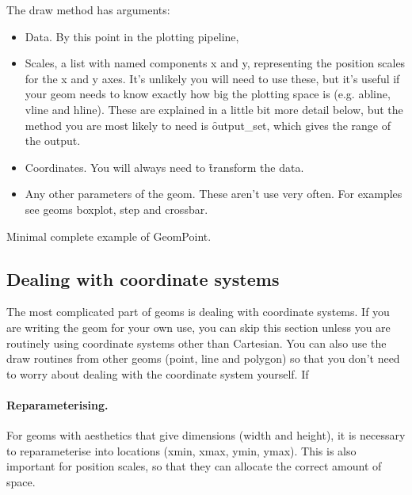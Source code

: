 % 


The draw method has arguments:

\begin{itemize}
  \item Data.  By this point in the plotting pipeline, 

  \item Scales, a list with named components x and y, representing the position scales for the x and y axes.  It's unlikely you will need to use these, but it's useful if your geom needs to know exactly how big the plotting space is (e.g. abline, vline and hline).  These are explained in a little bit more detail below, but the method you are most likely to need is \f{output_set}, which gives the range of the output.

  \item Coordinates.  You will always need to \f{transform} the data.

  \item Any other parameters of the geom.  These aren't use very often.  For examples see geoms boxplot, step and crossbar.
\end{itemize}

Minimal complete example of GeomPoint.


\subsection{Dealing with coordinate systems}

The most complicated part of geoms is dealing with coordinate systems. If you are writing the geom for your own use, you can skip this section unless you are routinely using coordinate systems other than Cartesian.  You can also use the draw routines from other geoms (point, line and polygon) so that you don't need to worry about dealing with the coordinate system yourself.  If 

\paragraph{Reparameterising.} For geoms with aesthetics that give dimensions (width and height), it is necessary to reparameterise into locations (xmin, xmax, ymin, ymax).  This is  also important for position scales, so that they can allocate the correct amount of space.

